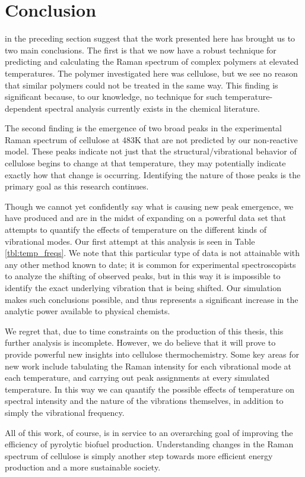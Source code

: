\chapter{Conclusion}

 in the preceding section suggest that the work presented here has brought us to two main conclusions. The first is that we now have a robust technique for predicting and calculating the Raman spectrum of complex polymers at elevated temperatures. The polymer investigated here was cellulose, but we see no reason that similar polymers could not be treated in the same way. This finding is significant because, to our knowledge, no technique for such temperature-dependent spectral analysis currently exists in the chemical literature.

The second finding is the emergence of two broad peaks in the experimental Raman spectrum of cellulose at 483K that are not predicted by our non-reactive model. These peaks indicate not just that the structural/vibrational behavior of cellulose begins to change at that temperature, they may potentially indicate exactly how that change is occurring. Identifying the nature of those peaks is the primary goal as this research continues.

Though we cannot yet confidently say what is causing new peak emergence, we have produced and are in the midst of expanding on a powerful data set that attempts to quantify the effects of temperature on the different kinds of vibrational modes. Our first attempt at this analysis is seen in Table \ref{tbl:temp_freqs}. We note that this particular type of data is not attainable with any other method known to date; it is common for experimental spectroscopists to analyze the shifting of observed peaks, but in this way it is impossible to identify the exact underlying vibration that is being shifted. Our simulation makes such conclusions possible, and thus represents a significant increase in the analytic power available to physical chemists.

We regret that, due to time constraints on the production of this thesis, this further analysis is incomplete. However, we do believe that it will prove to provide powerful new insights into cellulose thermochemistry. Some key areas for new work include tabulating the Raman intensity for each vibrational mode at each temperature, and carrying out peak assignments at every simulated temperature. In this way we can quantify the possible effects of temperature on spectral intensity and the nature of the vibrations themselves, in addition to simply the vibrational frequency.

All of this work, of course, is in service to an overarching goal of improving the efficiency of pyrolytic biofuel production. Understanding changes in the Raman spectrum of cellulose is simply another step towards more efficient energy production and a more sustainable society.